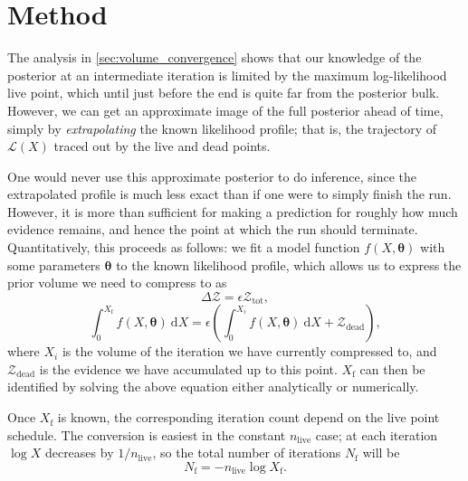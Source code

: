 \documentclass[usenatbib]{mnras}
\newcommand{\thetab}{\bm{\theta}}
\newcommand{\nlive}{n_\mathrm{live}}
\begin{document}
\section{Method}\label{sec:method}
The analysis in \cref{sec:volume_convergence} shows that our knowledge of the posterior at an intermediate iteration is limited by the maximum log-likelihood live point, which until just before the end is quite far from the posterior bulk. However, we can get an approximate image of the full posterior ahead of time, simply by \textit{extrapolating} the known likelihood profile; that is, the trajectory of $\mathcal{L}(X)$ traced out by the live and dead points.
\par
One would never use this approximate posterior to do inference, since the extrapolated profile is much less exact than if one were to simply finish the run. However, it is more than sufficient for making a prediction for roughly how much evidence remains, and hence the point at which the run should terminate. Quantitatively, this proceeds as follows: we fit a model function $f(X, \thetab)$ with some parameters $\thetab$ to the known likelihood profile, which allows us to express the prior volume we need to compress to as
\begin{equation}
	\Delta \mathcal{Z} = \epsilon \mathcal{Z}_\mathrm{tot},
\end{equation}
\begin{equation}\label{endpoint}
	\int_0^{X_\mathrm{f}} f(X, \thetab)\ \mathrm{d}X = \epsilon \left( \int_0^{X_i} f(X, \thetab)\ \mathrm{d}X + \mathcal{Z}_\mathrm{dead} \right),
\end{equation}
where $X_i$ is the volume of the iteration we have currently compressed to, and $\mathcal{Z}_\mathrm{dead}$ is the evidence we have accumulated up to this point. $X_\mathrm{f}$ can then be identified by solving the above equation either analytically or numerically. 
\par
Once $X_\mathrm{f}$ is known, the corresponding iteration count depend on the live point schedule. The conversion is easiest in the constant $\nlive$ case; at each iteration $\log X$ decreases by $1/\nlive$, so the total number of iterations $N_\mathrm{f}$ will be
\begin{equation}
	N_\mathrm{f} = - \nlive \log X_\mathrm{f} .
\end{equation}
\end{document}
